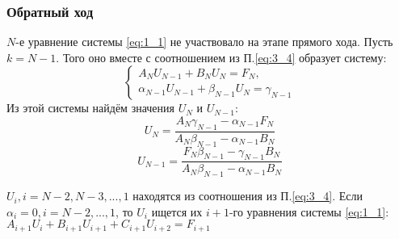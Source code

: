 \subsubsection{Обратный ход}
\(N\)-е уравнение системы \ref{eq:1_1} не участвовало на этапе прямого хода.
Пусть \(k=N-1\). Того оно вместе с соотношением из П.\ref{eq:3_4} образует систему:
\[
  \begin{cases}
    A_N U_{N-1} + B_N U_N = F_N,
    \\
    \alpha_{N-1} U_{N-1} + \beta_{N-1} U_N = \gamma_{N-1}
  \end{cases}  
\]
Из этой системы найдём значения \(U_N\) и \(U_{N-1}\):
\[
  U_N = \frac{A_N \gamma_{N-1} - \alpha_{N-1} F_N}{A_N\beta_{N-1}-\alpha_{N-1}B_N}
\]
\[
  U_{N-1} = \frac{F_N\beta_{N-1}-\gamma_{N-1}B_N}{A_N \beta_{N-1} - \alpha_{N-1}B_N}
\]

\(U_i, i=N-2,N-3,...,1\) находятся из соотношения из П.\ref{eq:3_4}. Если \(\alpha_i=0, i=N-2,...,1\), то \(U_i\) ищется их \(i+1\)-го уравнения системы \ref{eq:1_1}: \(A_{i+1}U_i+B_{i+1}U_{i+1}+C_{i+1}U_{i+2}=F_{i+1}\)